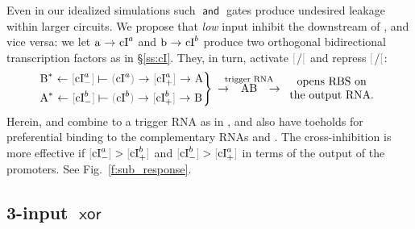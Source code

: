 \documentclass[12pt,notitlepage]{article}
\newcommand{\TODO}[1]{\textrm{\color{red}TODO: #1}}
\newcommand{\AND}{\ensuremath{\mathop{\mathsf{and}}}\xspace}
\newcommand{\XOR}{\ensuremath{\mathop{\mathsf{xor}}}\xspace}
\newcommand{\cbra}[1]{{\ensuremath{\color{gray}{#1}}}}
\newcommand{\protein}[1]{{{\cbra{(}\ce{#1}\cbra{)}}}}
\newcommand{\promoter}[1]{{{\cbra{[}\ce{#1}\cbra{]}}}}
\newcommand{\act}{\ {\ensuremath{\mathbin{\to}}}\ }
\newcommand{\rep}{\ {\ensuremath{\mathrel{\raisebox{-.3ex}{\rotatebox{90}{\scalebox{1}[1.2]{$\bot$}}}}}}\ }
\begin{document}
Even in our idealized simulations
such \AND gates produce undesired leakage
within larger circuits.
%
%
%
We propose that
\emph{low} input  
{inhibit} the downstream of ,
and vice versa:
%
we let $\ce{a} \act \ce{cI^a}$
and
$\ce{b} \act \ce{cI^b}$
produce
two orthogonal 
bidirectional
transcription factors as in \S\ref{ss:cI}.
%
They, in turn, 
activate \promoter{cI^a_+}/\promoter{cI^b_+}
and 
repress \promoter{cI^a_-}/\promoter{cI^b_-}:
%
%
\begin{align}
    \begin{rcases*}
        \ce{B^*} \reflectbox{\act} 
        \promoter{cI^a_-} \reflectbox{\rep} \protein{cI^a} \act \promoter{cI^a_+} 
        \act \ce{A}
        \\
        \ce{A^*} \reflectbox{\act} 
        \promoter{cI^b_-} \reflectbox{\rep} \protein{cI^b} \act \promoter{cI^b_+} 
        \act \ce{B}
    \end{rcases*}
    \act 
    \stackrel{\hspace{-10pt}\smash{\text{trigger RNA}}\hspace{-10pt}}{\ce{AB}}
    \act 
    \begin{array}{c}
        \text{opens RBS on} \\ \text{the output RNA.}
    \end{array}
\end{align}
%
%
Herein,
 and  
combine to a trigger RNA  as in
\cite[\href{https://www.nature.com/articles/nature23271/figures/2}{Fig.~2e}]{GreenETAL2017},
and also have toeholds
for preferential binding to 
the complementary RNAs  and .
%
%
The cross-inhibition is more effective
if
$\promoter{cI^a_-} > \promoter{cI^b_+}$
and
$\promoter{cI^b_-} > \promoter{cI^a_+}$
in terms of the output of the promoters.
%
%
See Fig.~\ref{f:sub_response}.





%


\subsection{3-input \texorpdfstring{\XOR}{XOR}} \label{ss:3xor}
\end{document}
